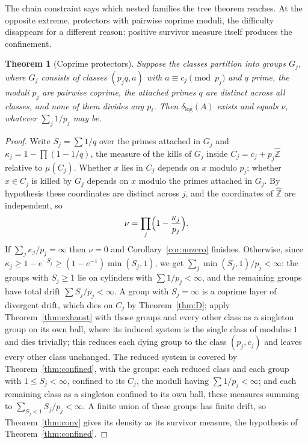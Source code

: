 \documentclass[11pt]{article}
\theoremstyle{plain}
\newtheorem{theorem}{Theorem}[section]
\theoremstyle{definition}
\newcommand{\Zhat}{\widehat{\mathbb{Z}}}
\newcommand{\dlog}{\delta_{\log}}
\begin{document}
The chain constraint says which nested families the tree
theorem reaches.  At the opposite extreme, protectors with
pairwise coprime moduli, the difficulty disappears for a
different reason: positive survivor measure itself produces the
confinement.

\begin{theorem}[Coprime protectors]\label{thm:coprot}
Suppose the classes partition into groups $G_j$, where $G_j$
consists of classes $(p_jq,a)$ with $a\equiv c_j\pmod{p_j}$ and
$q$ prime, the moduli $p_j$ are pairwise coprime, the attached
primes $q$ are distinct across all classes, and none of them
divides any $p_i$.  Then $\dlog(A)$ exists and equals $\nu$,
whatever $\sum_j1/p_j$ may be.
\end{theorem}

\begin{proof}
Write $S_j=\sum1/q$ over the primes attached in $G_j$ and
$\kappa_j=1-\prod(1-1/q)$, the measure of the kills of $G_j$
inside $C_j=c_j+p_j\Zhat$ relative to $\mu(C_j)$.  Whether $x$
lies in $C_j$ depends on $x$ modulo $p_j$; whether $x\in C_j$ is
killed by $G_j$ depends on $x$ modulo the primes attached in
$G_j$.  By hypothesis these coordinates are distinct across $j$,
and the coordinates of $\Zhat$ are independent, so
\[
\nu=\prod_j\Bigl(1-\frac{\kappa_j}{p_j}\Bigr).
\]
If $\sum_j\kappa_j/p_j=\infty$ then $\nu=0$ and
Corollary~\ref{cor:nuzero} finishes.  Otherwise, since
$\kappa_j\ge1-e^{-S_j}\ge(1-e^{-1})\min(S_j,1)$, we get
$\sum_j\min(S_j,1)/p_j<\infty$: the groups with $S_j\ge1$ lie on
cylinders with $\sum1/p_j<\infty$, and the remaining groups have
total drift $\sum S_j/p_j<\infty$.  A group with $S_j=\infty$ is
a coprime layer of divergent drift, which dies on $C_j$ by
Theorem~\ref{thm:D}; apply Theorem~\ref{thm:exhaust} with those
groups and every other class as a singleton group on its own
ball, where its induced system is the single class of modulus
$1$ and dies trivially; this reduces each dying group to the
class $(p_j,c_j)$ and leaves every other class unchanged.  The reduced system is covered
by Theorem~\ref{thm:confined}, with the groups: each reduced
class and each group with $1\le S_j<\infty$, confined to its
$C_j$, the moduli having $\sum1/p_j<\infty$; and each remaining
class as a singleton confined to its own ball, these measures
summing to $\sum_{S_j<1}S_j/p_j<\infty$.  A finite union of
these groups has finite drift, so Theorem~\ref{thm:conv} gives
its density as its survivor measure, the hypothesis of
Theorem~\ref{thm:confined}.
\end{proof}
\end{document}
